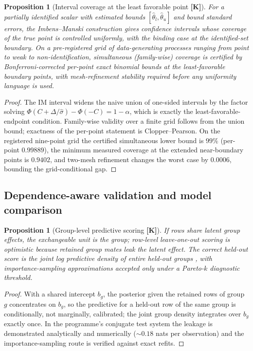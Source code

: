 \documentclass[10pt]{article}
\newtheorem{proposition}[theorem]{Proposition}
\theoremstyle{definition}
\newcommand{\tier}[1]{\textbf{[#1]}}
\begin{document}
\begin{proposition}[Interval coverage at the least favorable point
\tier{K}]
\label{prop:im}
For a partially identified scalar with estimated bounds
$[\hat\theta_l, \hat\theta_u]$ and bound standard errors, the
Imbens--Manski construction \cite{ImbensManski2004} gives confidence
intervals whose coverage of the true point is controlled uniformly,
with the binding case at the identified-set boundary. On a
pre-registered grid of data-generating processes ranging from point to
weak to non-identification, simultaneous (family-wise) coverage is
certified by Bonferroni-corrected per-point exact binomial bounds at
the least-favorable boundary points, with mesh-refinement stability
required before any uniformity language is used.
\end{proposition}
\begin{proof}
The IM interval widens the naive union of one-sided intervals by the
factor solving $\Phi(C + \Delta/\hat\sigma) - \Phi(-C) = 1-\alpha$,
which is exactly the least-favorable-endpoint condition. Family-wise
validity over a finite grid follows from the union bound; exactness
of the per-point statement is Clopper--Pearson. On the registered
nine-point grid the certified simultaneous lower bound is $99\%$
(per-point $0.99889$), the minimum measured coverage at the extended
near-boundary points is $0.9402$, and two-mesh refinement changes the
worst case by $0.0006$, bounding the grid-conditional gap.
\end{proof}

\subsection{Dependence-aware validation and model comparison}

\begin{proposition}[Group-level predictive scoring \tier{K}]
\label{prop:elpd}
If rows share latent group effects, the exchangeable unit is the group;
row-level leave-one-out scoring is optimistic because retained group
mates leak the latent effect. The correct held-out score is the joint
log predictive density of entire held-out groups
\cite{VehtariGelmanGabry2017}, with importance-sampling approximations
accepted only under a Pareto-$k$ diagnostic threshold.
\end{proposition}
\begin{proof}
With a shared intercept $b_g$, the posterior given the retained rows of
group $g$ concentrates on $b_g$, so the predictive for a held-out row
of the same group is conditionally, not marginally, calibrated;
the joint group density integrates over $b_g$ exactly once. In the
programme's conjugate test system the leakage is demonstrated
analytically and numerically (${\sim}0.18$ nats per observation) and
the importance-sampling route is verified against exact refits.
\end{proof}
\end{document}

